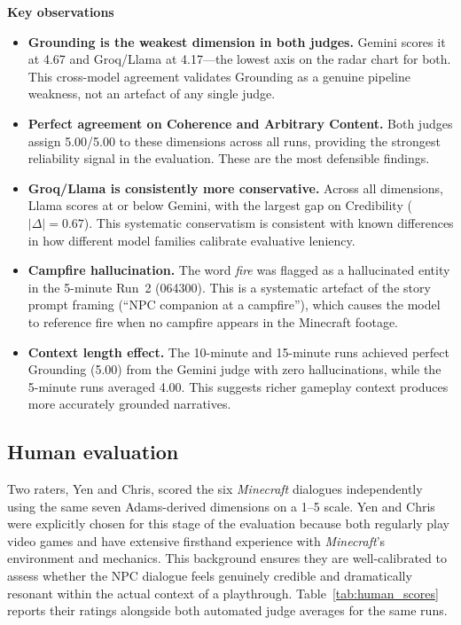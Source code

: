 \documentclass[11pt]{article}
\begin{document}
\noindent\textbf{Key observations}
\begin{itemize}
  \item \textbf{Grounding is the weakest dimension in both judges.} Gemini scores it at 4.67 and Groq/Llama at 4.17---the lowest axis on the radar chart for both. This cross-model agreement validates Grounding as a genuine pipeline weakness, not an artefact of any single judge.
  \item \textbf{Perfect agreement on Coherence and Arbitrary Content.} Both judges assign 5.00/5.00 to these dimensions across all runs, providing the strongest reliability signal in the evaluation. These are the most defensible findings.
  \item \textbf{Groq/Llama is consistently more conservative.} Across all dimensions, Llama scores at or below Gemini, with the largest gap on Credibility ($|\Delta|=0.67$). This systematic conservatism is consistent with known differences in how different model families calibrate evaluative leniency.
  \item \textbf{Campfire hallucination.} The word \emph{fire} was flagged as a hallucinated entity in the 5-minute Run~2 (064300). This is a systematic artefact of the story prompt framing (``NPC companion at a campfire''), which causes the model to reference fire when no campfire appears in the Minecraft footage.
  \item \textbf{Context length effect.} The 10-minute and 15-minute runs achieved perfect Grounding (5.00) from the Gemini judge with zero hallucinations, while the 5-minute runs averaged 4.00. This suggests richer gameplay context produces more accurately grounded narratives.
\end{itemize}

\subsection{Human evaluation}

Two raters, Yen and Chris, scored the six \emph{Minecraft} dialogues independently using the same seven Adams-derived dimensions on a 1--5 scale. Yen and Chris were explicitly chosen for this stage of the evaluation because both regularly play video games and have extensive firsthand experience with \emph{Minecraft}'s environment and mechanics. This background ensures they are well-calibrated to assess whether the NPC dialogue feels genuinely credible and dramatically resonant within the actual context of a playthrough. Table~\ref{tab:human_scores} reports their ratings alongside both automated judge averages for the same runs.
\end{document}
